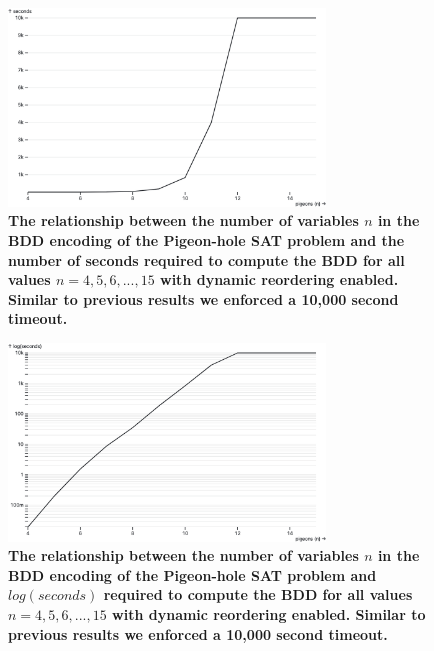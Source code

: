 \documentclass{article}
\begin{document}
\begin{figure}
  \centering
  \includegraphics[width=0.75\textwidth]{bdd-reorder}
  \caption{\textbf{The relationship between the number of variables $n$ in the BDD encoding of the Pigeon-hole SAT problem and the number of seconds required to compute the BDD for all values $n = 4, 5, 6,...,15$ with dynamic reordering enabled. Similar to previous results we enforced a 10,000 second timeout.}}
  \label{fig:bdd-reorder}
\end{figure}

\begin{figure}
  \centering
  \includegraphics[width=0.75\textwidth]{bdd-reorder-log}
  \caption{\textbf{The relationship between the number of variables $n$ in the BDD encoding of the Pigeon-hole SAT problem and $log(seconds)$ required to compute the BDD for all values $n = 4, 5, 6,...,15$ with dynamic reordering enabled. Similar to previous results we enforced a 10,000 second timeout.}}
  \label{fig:bdd-reorder-log}
\end{figure}

\clearpage



\end{document}
